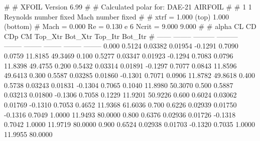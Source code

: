 #  
#       XFOIL         Version 6.99
#  
# Calculated polar for: DAE-21 AIRFOIL                                  
#  
# 1 1 Reynolds number fixed          Mach number fixed         
#  
# xtrf =   1.000 (top)        1.000 (bottom)  
# Mach =   0.000     Re =     0.130 e 6     Ncrit =   9.000  9.000
#  
#   alpha    CL        CD       CDp       CM     Top_Xtr  Bot_Xtr  Top_Itr  Bot_Itr
#  ------ -------- --------- --------- -------- -------- -------- -------- --------
   0.000   0.5124   0.03382   0.01954  -0.1291   0.7090   0.0759  11.8185  49.3469
   0.100   0.5277   0.03347   0.01923  -0.1294   0.7083   0.0796  11.8398  49.4755
   0.200   0.5432   0.03314   0.01891  -0.1297   0.7077   0.0843  11.8596  49.6413
   0.300   0.5587   0.03285   0.01860  -0.1301   0.7071   0.0906  11.8782  49.8618
   0.400   0.5738   0.03243   0.01831  -0.1304   0.7065   0.1040  11.8980  50.3070
   0.500   0.5887   0.03213   0.01800  -0.1306   0.7058   0.1229  11.9201  50.9226
   0.600   0.6024   0.03062   0.01769  -0.1310   0.7053   0.4652  11.9368  61.6036
   0.700   0.6226   0.02939   0.01750  -0.1316   0.7049   1.0000  11.9493  80.0000
   0.800   0.6376   0.02936   0.01726  -0.1318   0.7042   1.0000  11.9719  80.0000
   0.900   0.6524   0.02938   0.01703  -0.1320   0.7035   1.0000  11.9955  80.0000
